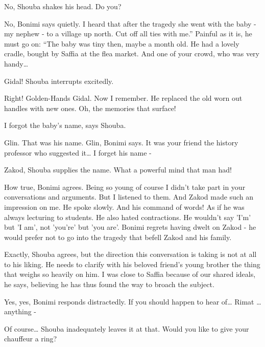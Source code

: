 \documentclass[letterpaper]{article}
\begin{document}
{\textquotedbl}No,{\textquotedbl} Shouba shakes his head. {\textquotedbl}Do you?{\textquotedbl} 

{\textquotedbl}No,{\textquotedbl} Bonimi says quietly. {\textquotedbl}I heard that after the tragedy she went with the
baby - my nephew - to a village up north. Cut off all ties with me.'' Painful as it is, he must go on: ``The baby was
tiny then, maybe a month old. He had a lovely cradle, bought by Saffia at the flea market. And one of your crowd, who
was very handy{\dots}{\textquotedbl}

{\textquotedbl}Gidal!{\textquotedbl} Shouba interrupts excitedly.

{\textquotedbl}Right! Golden-Hands Gidal. Now I remember. He replaced the old worn out handles with new ones. Oh, the
memories that surface!{\textquotedbl}

{\textquotedbl}I forgot the baby's name,{\textquotedbl} says Shouba.

{\textquotedbl}Glin. That was his name. Glin,{\textquotedbl} Bonimi says. {\textquotedbl}It was your friend the history
professor who suggested it{\dots} I forget his name -{\textquotedbl}

{\textquotedbl}Zakod,{\textquotedbl} Shouba supplies the name. {\textquotedbl}What a powerful mind that man
had!{\textquotedbl}

{\textquotedbl}How true,{\textquotedbl} Bonimi agrees. {\textquotedbl}Being so young of course I didn't take part in
your conversations and arguments. But I listened to them. And Zakod made such an impression on me. He spoke slowly. And
his command of words! As if he was always lecturing to students. He also hated contractions. He wouldn't say 'I'm' but
'I am', not 'you're' but 'you are'.{\textquotedbl} Bonimi regrets having dwelt on Zakod - he would prefer not to go
into the tragedy that befell Zakod and his family.

{\textquotedbl}Exactly,{\textquotedbl} Shouba agrees, but the direction this conversation is taking is not at all to his
liking. He needs to clarify with his beloved friend's young brother the thing that weighs so heavily on him.
{\textquotedbl}I was close to Saffia because of our shared ideals,{\textquotedbl} he says, believing he has thus found
the way to broach the subject. 

{\textquotedbl}Yes, yes,{\textquotedbl} Bonimi responds distractedly. {\textquotedbl}If you should happen to hear
of{\dots} Rimat {\dots} anything -{\textquotedbl} 

{\textquotedbl}Of course{{\dots}}{\textquotedbl} Shouba inadequately leaves it
at that. {\textquotedbl}Would you like to give your chauffeur a ring?{\textquotedbl}
\end{document}

